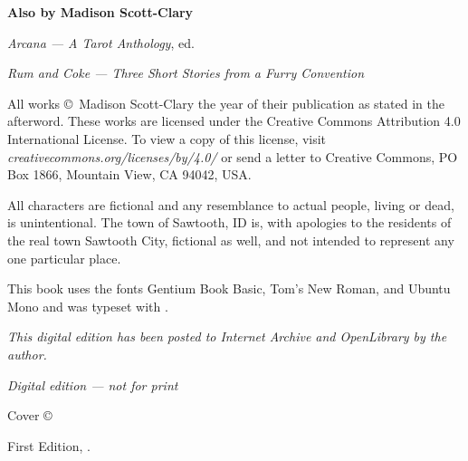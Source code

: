 
\thispagestyle{empty}
\null
\vfill
\begin{center}
    \textbf{Also by Madison Scott-Clary}

    \emph{Arcana --- A Tarot Anthology}, ed.

    \emph{Rum and Coke --- Three Short Stories from a Furry Convention}
\end{center}
\vfill
\singlespacing
{\small\parindent0pt\parskip5pt
\noindent All works \copyright\ Madison Scott-Clary the year of their publication as stated in the afterword. These works are licensed under the Creative Commons Attribution 4.0 International License. To view a copy of this license, visit \mbox{\emph{creativecommons.org/licenses/by/4.0/}} or send a letter to Creative Commons, PO Box 1866, Mountain View, CA 94042, USA.

All characters are fictional and any resemblance to actual people, living or dead, is unintentional. The town of Sawtooth, ID is, with apologies to the residents of the real town Sawtooth City, fictional as well, and not intended to represent any one particular place.

This book uses the fonts Gentium Book Basic, {\TitleFont Tom's New Roman}, and {\MUCKFont Ubuntu Mono} and was typeset with {\XeLaTeX}.

\vspace{1ex}

\textit{This digital edition has been posted to Internet Archive and OpenLibrary by the author.}

\emph{Digital edition --- not for print}

\vspace{1ex}

\emph{\Title}

\vspace{1ex}

Cover \copyright\ \Year\ \Illustrator\\
\IllustratorWeb

\vspace{1ex}

First Edition, \Year.

\EditionsList
}

\cleardoublepage
